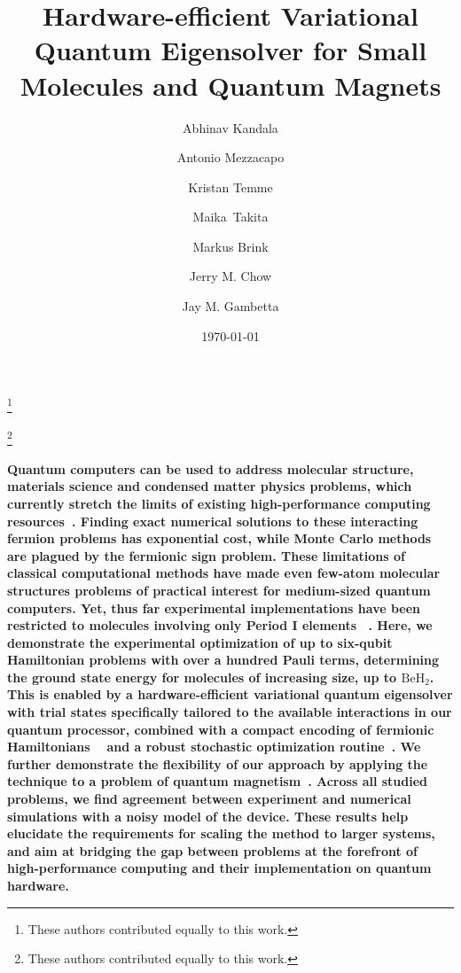\documentclass[twocolumn]{revtex4-1}
\newcommand{\1}{\mathbbm{1}}
\begin{document}
\title{ Hardware-efficient Variational Quantum Eigensolver for Small Molecules and Quantum Magnets}


\author{Abhinav Kandala}
\thanks{These authors contributed equally to this work.}
\author{Antonio Mezzacapo}
\thanks{These authors contributed equally to this work.}
\author{Kristan Temme}
\author{\mbox{Maika Takita} }
\author{Markus Brink }
\author{Jerry M. Chow}
\author{Jay M. Gambetta }


\date{\today}

\maketitle
\noindent


\textbf{Quantum computers can be used to address molecular structure, materials science and condensed matter physics problems, which currently stretch the limits of existing high-performance computing resources~\cite{NERSCReport2015}. Finding exact numerical solutions to these interacting fermion problems has exponential cost, while Monte Carlo methods  are plagued by the fermionic sign problem. These limitations of classical computational methods have made even few-atom molecular structures problems of practical interest for medium-sized quantum computers. Yet, thus far experimental implementations have been restricted to molecules involving only Period I elements~ \cite{Lanyon2010,Du10,Peruzzo13,Wang15,OMalley16,Shen17,Paesani2017}. Here, we demonstrate the experimental optimization of up to six-qubit Hamiltonian problems with over a hundred Pauli terms, determining the ground state energy for molecules of increasing size, up to $\textrm{BeH}_2$. This is enabled by a hardware-efficient variational quantum eigensolver with trial states specifically tailored to the available interactions in our quantum processor, combined with a compact encoding of fermionic Hamiltonians ~\cite{Tapering} and a robust stochastic optimization routine~\cite{Spall1992}. We further demonstrate the flexibility of our approach by applying the technique to a problem of quantum magnetism~\cite{Lanyon2011}. Across all studied problems, we find agreement between experiment and numerical simulations with a noisy model of the device. These results help elucidate the requirements for scaling the method to larger systems, and aim at bridging the gap between problems at the forefront of high-performance computing and their implementation on quantum hardware.}
\end{document}
